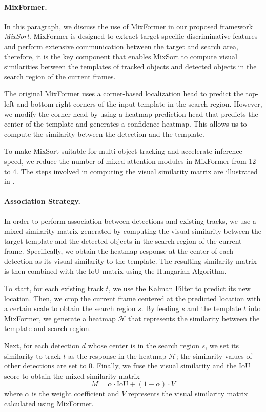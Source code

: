 \documentclass[10pt,twocolumn,letterpaper]{article}
\begin{document}
\paragraph{MixFormer.} 
In this paragraph, we discuss the use of MixFormer in our proposed framework \textit{MixSort}. MixFormer is designed to extract target-specific discriminative features and perform extensive communication between the target and search area, therefore, it is the key component that enables MixSort to compute visual similarities between the templates of tracked objects and detected objects in the search region of the current frames.

The original MixFormer uses a corner-based localization head to predict the top-left and bottom-right corners of the input template in the search region. However, we modify the corner head by using a heatmap prediction head that predicts the center of the template and generates a confidence heatmap. This allows us to compute the similarity between the detection and the template.

To make MixSort suitable for multi-object tracking and accelerate inference speed, we reduce the number of mixed attention modules in MixFormer from 12 to 4. The steps involved in computing the visual similarity matrix are illustrated in .

\vspace{-4mm}
\paragraph{Association Strategy.} 
In order to perform association between detections and existing tracks, we use a mixed similarity matrix generated by computing the visual similarity between the target template and the detected objects in the search region of the current frame. Specifically, we obtain the heatmap response at the center of each detection as its visual similarity to the template. The resulting similarity matrix is then combined with the IoU matrix using the Hungarian Algorithm.

To start, for each existing track $t$, we use the Kalman Filter to predict its new location. Then, we crop the current frame centered at the predicted location with a certain scale to obtain the search region $s$. By feeding $s$ and the template $t$ into MixFormer, we generate a heatmap $\mathcal{H}$ that represents the similarity between the template and search region.

Next, for each detection $d$ whose center is in the search region $s$, we set its similarity to track $t$ as the response in the heatmap $\mathcal{H}$; the similarity values of other detections are set to $0$. Finally, we fuse the visual similarity and the IoU score to obtain the mixed similarity matrix
\begin{equation}
	M=\alpha\cdot\text{IoU}+(1-\alpha)\cdot V
    \label{eq:M}
\end{equation}
where $\alpha$ is the weight coefficient and $V$ represents the visual similarity matrix calculated using MixFormer.
\end{document}
